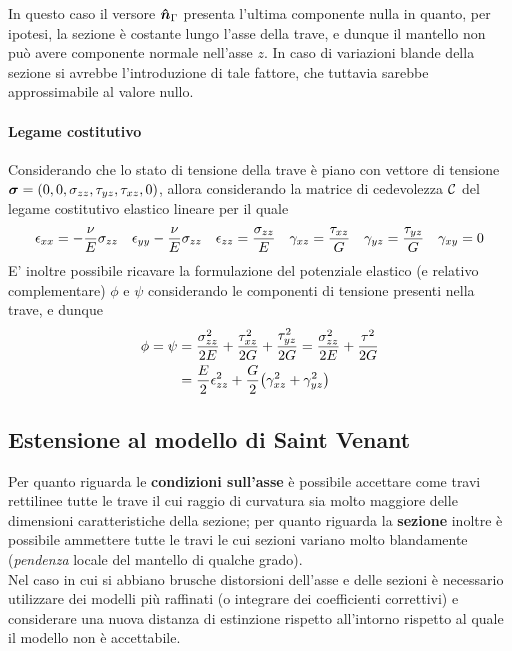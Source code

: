		\begin{nota}
			In questo caso il versore $\boldsymbol{\hat{n}}_\Gamma$ presenta l'ultima componente nulla in quanto, per ipotesi, la sezione è costante lungo l'asse della trave, e dunque il mantello non può avere componente normale nell'asse $z$. In caso di variazioni blande della sezione si avrebbe l'introduzione di tale fattore, che tuttavia sarebbe approssimabile al valore nullo.
			
		\end{nota}
		
		\paragraph{Legame costitutivo} Considerando che lo stato di tensione della trave è piano con vettore di tensione $\boldsymbol{\sigma}= (0,0,\sigma_{zz},\tau_{yz},\tau_{xz},0)$, allora considerando la matrice di cedevolezza $\mathcal C$ del legame costitutivo elastico lineare per il quale
		\[ \epsilon_{xx} = - \frac \nu E \sigma_{zz} \quad \epsilon_{yy} -\frac \nu E \sigma_{zz} \quad \epsilon_{zz} = \frac {\sigma_{zz}} E \quad \gamma_{xz} = \frac {\tau_{xz}} G \quad \gamma_{yz} = \frac {\tau_{yz}} G \quad \gamma_{xy} = 0  \]
		E' inoltre possibile ricavare la formulazione del potenziale elastico (e relativo complementare) $\phi$ e $\psi$ considerando le componenti di tensione presenti nella trave, e dunque
		\begin{align*}
			\phi = \psi & = \frac{\sigma_{zz}^2}{2E} + \frac{\tau_{xz}^2}{2G} + \frac{\tau_{yz}^2}{2G} = \frac{\sigma_{zz}^2}{2E} + \frac{\tau^2}{2G} \\ 
			& = \frac E 2 \epsilon_{zz}^2 + \frac G 2 \big(\gamma_{xz}^2 + \gamma_{yz}^2\big)
		\end{align*}
		
	\subsection{Estensione al modello di Saint Venant}
		Per quanto riguarda le \textbf{condizioni sull'asse} è possibile accettare come travi rettilinee tutte le trave il cui raggio di curvatura sia molto maggiore delle dimensioni caratteristiche della sezione; per quanto riguarda la \textbf{sezione} inoltre è possibile ammettere tutte le travi le cui sezioni variano molto blandamente (\textit{pendenza} locale del mantello di qualche grado). \\
		Nel caso in cui si abbiano brusche distorsioni dell'asse e delle sezioni è necessario utilizzare dei modelli più raffinati (o integrare dei coefficienti correttivi) e considerare una nuova distanza di estinzione rispetto all'intorno rispetto al quale il modello non è accettabile.
		
